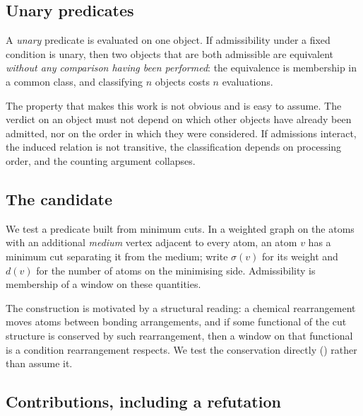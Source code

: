 \documentclass[11pt,twocolumn,a4paper]{article}
\theoremstyle{upthm}
\theoremstyle{definition}
\theoremstyle{remark}
\newcommand{\sep}{\sigma}
\newcommand{\dep}{d}
\begin{document}
\subsection{Unary predicates}

A \emph{unary} predicate is evaluated on one object. If admissibility
under a fixed condition is unary, then two objects that are both
admissible are equivalent \emph{without any comparison having been
performed}: the equivalence is membership in a common class, and
classifying $n$ objects costs $n$ evaluations.

The property that makes this work is not obvious and is easy to assume.
The verdict on an object must not depend on which other objects have
already been admitted, nor on the order in which they were considered. If
admissions interact, the induced relation is not transitive, the
classification depends on processing order, and the counting argument
collapses.

\subsection{The candidate}

We test a predicate built from minimum cuts. In a weighted graph on the
atoms with an additional \emph{medium} vertex adjacent to every atom, an
atom $v$ has a minimum cut separating it from the medium; write $\sep(v)$
for its weight and $\dep(v)$ for the number of atoms on the minimising
side. Admissibility is membership of a window on these quantities.

The construction is motivated by a structural reading: a chemical
rearrangement moves atoms between bonding arrangements, and if some
functional of the cut structure is conserved by such rearrangement, then
a window on that functional is a condition rearrangement respects. We
test the conservation directly () rather than
assume it.

\subsection{Contributions, including a refutation}
\end{document}
